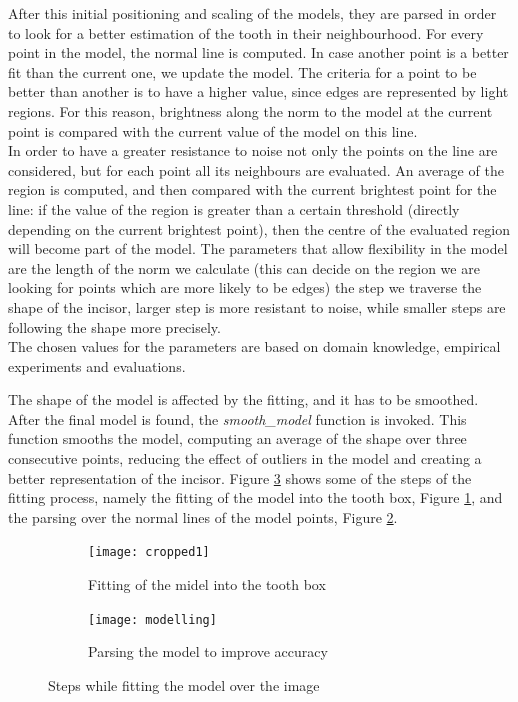 \documentclass[a4paper]{article}
\begin{document}
After this initial positioning and scaling of the models, they are parsed in order to look for a better estimation of the tooth in their neighbourhood. For every point in the model, the normal line is computed. In case another point is a better fit than the current one, we update the model. The criteria for a point to be better than another is to have a higher value, since edges are represented by light regions. For this reason, brightness along the norm to the model at the current point is compared with the current value of the model on this line. 
\\ In order to have a greater resistance to noise not only the points on the line are considered, but for each point all its neighbours are evaluated. An average of the region is computed, and then compared with the current brightest point for the line: if the value of the region is greater than a certain threshold (directly depending on the current brightest point), then the centre of the evaluated region will become part of the model. The parameters that allow flexibility in the model are the length of the norm we calculate (this can decide on the region we are looking for points which are more likely to be edges) the step we traverse the shape of the incisor, larger step is more resistant to noise, while smaller steps are following the shape more precisely. \\
The chosen values for the parameters are based on domain knowledge, empirical experiments and evaluations. 

The shape of the model is affected by the fitting, and it has to be smoothed. After the final model is found, the \textit{smooth\_model} function is invoked. This function smooths the model, computing an average of the shape over three consecutive points, reducing the effect of outliers in the model and creating a better representation of the incisor.  
Figure \ref{fig:fitting} shows some of the steps of the fitting process, namely the fitting of the model into the tooth box, Figure \ref{fig:fitting1}, and the parsing over the normal lines of the model points, Figure \ref{fig:fitting2}.

\begin{figure}[htp]
    \centering
    \begin{subfigure}[b]{0.45\textwidth}
        \texttt{[image: cropped1]}
        \caption{Fitting of the midel into the tooth box}
        \label{fig:fitting1}
    \end{subfigure}
    \begin{subfigure}[b]{0.45\textwidth}
        \texttt{[image: modelling]} 
        \caption{Parsing the model to improve accuracy}
        \label{fig:fitting2}
    \end{subfigure}
    \caption{Steps while fitting the model over the image}
    \label{fig:fitting}
\end{figure}
\end{document}
